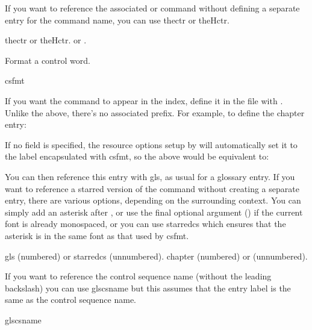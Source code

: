 \documentclass[toc=listof]{scrreport}
\begin{document}
If you want to reference the associated 
or 
command without defining a separate entry for the command name, you
can use \gls{thectr} or \gls{theHctr}.
\begin{coderesult}
\gls{thectr} or
\gls{theHctr}.
\tcblower
{} or
.
\end{coderesult}

Format a control word.
\begin{coderesult}
\gls{csfmt}
\tcblower
{}
\end{coderesult}

If you want the command to appear in the index, define it in the
 file with . Unlike the above, there's
no associated prefix. For example, to define the \gls{chapter} entry:
\begin{codebox}
\end{codebox}
If no  field is specified, the resource options setup by
 will automatically set it to the label
encapsulated with \gls{csfmt}, so the above would be equivalent to:
\begin{codebox}
\end{codebox}
You can then reference this entry with \gls{gls}, as usual for a
glossary entry. If you want to reference a starred version of the
command without creating a separate entry, there are various
options, depending on the surrounding context. You can simply add an
asterisk after , or
use the final optional argument ()
if the current font is already monospaced, or you can use
\gls{starredcs} which ensures that the asterisk is in the same font
as that used by \gls{csfmt}.
\begin{coderesult}
\gls{gls}
(numbered) or
\gls{starredcs}
(unnumbered).
\tcblower
\gls{chapter}
(numbered) or
(unnumbered).
\end{coderesult}

If you want to reference the control sequence name (without the
leading backslash) you can use \gls{glscsname} but this assumes that
the entry label is the same as the control sequence name.
\begin{coderesult}
\gls{glscsname}
\tcblower
{}
\end{coderesult}
\end{document}
